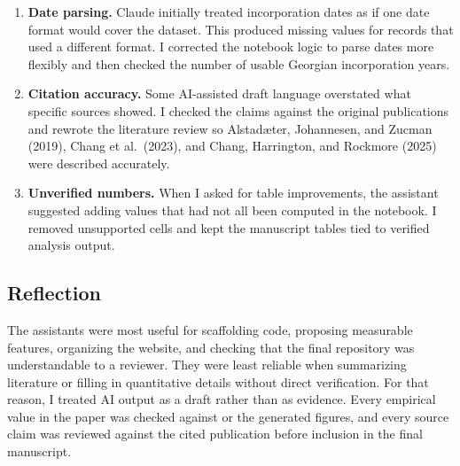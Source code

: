 \documentclass[9pt,twoside]{pnas-new}
\begin{document}
\begin{enumerate}
  \item \textbf{Date parsing.} Claude initially treated incorporation dates as if one date format would cover the dataset. This produced missing values for records that used a different format. I corrected the notebook logic to parse dates more flexibly and then checked the number of usable Georgian incorporation years.
  \item \textbf{Citation accuracy.} Some AI-assisted draft language overstated what specific sources showed. I checked the claims against the original publications and rewrote the literature review so Alstad{\ae}ter, Johannesen, and Zucman (2019), Chang et al.\ (2023), and Chang, Harrington, and Rockmore (2025) were described accurately.
  \item \textbf{Unverified numbers.} When I asked for table improvements, the assistant suggested adding values that had not all been computed in the notebook. I removed unsupported cells and kept the manuscript tables tied to verified analysis output.
\end{enumerate}

\subsection*{Reflection}

The assistants were most useful for scaffolding code, proposing measurable features, organizing the website, and checking that the final repository was understandable to a reviewer. They were least reliable when summarizing literature or filling in quantitative details without direct verification. For that reason, I treated AI output as a draft rather than as evidence. Every empirical value in the paper was checked against  or the generated figures, and every source claim was reviewed against the cited publication before inclusion in the final manuscript.
\end{document}
